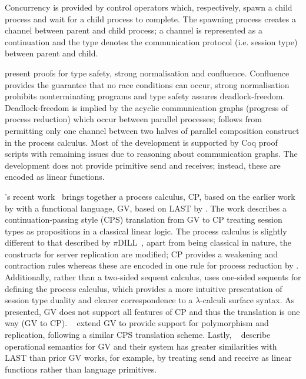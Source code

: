 \documentclass{mprop}
\begin{document}
Concurrency is provided by control operators which, respectively, spawn a
child process and wait for a child process to complete. The spawning process
creates a channel between parent and child process; a channel is represented
as a continuation and the type denotes the communication protocol
(i.e. session type) between parent and child.

\citeauthor{Mazurak:2010:LCC} present proofs for type safety, strong
normalisation and confluence. Confluence provides the guarantee that no race
conditions can occur, strong normalisation prohibits nonterminating programs
and type safety assures deadlock-freedom. Deadlock-freedom is implied by the
acyclic communication graphs (progress of process reduction) which occur
between parallel processes; follows from permitting only one channel between
two halves of parallel composition construct in the process calculus. Most of
the development is supported by Coq proof scripts with remaining issues due to
reasoning about communication graphs. The development does not provide
primitive send and receives; instead, these are encoded as linear functions.

\citeauthor{Wadler:2014}'s recent work~\cite{Wadler:2014} brings together a
process calculus, CP, based on the earlier work by
\citeauthor{Caires:2010:STI} with a functional language, GV, based on LAST by
\citeauthor{Gay:2010:LAST}. The work describes a continuation-passing style
(CPS) translation from GV to CP treating session types as propositions in a
classical linear logic. The process calculus is slightly different to that
described by $\pi$DILL~\cite{Caires:2010:STI}, apart from being classical in
nature, the constructs for server replication are modified; CP provides a
weakening and contraction rules whereas these are encoded in one rule for
process reduction by \citeauthor{Caires:2010:STI}. Additionally, rather than a
two-sided sequent calculus, \citeauthor{Wadler:2014} uses one-sided sequents
for defining the process calculus, which provides a more intuitive
presentation of session type duality and clearer correspondence to a
$\lambda$-calculi surface syntax. As presented, GV does not support all
features of CP and thus the translation is one way (GV to
CP). \citeauthor{Lindley:2014:SAP}~\cite{Lindley:2014:SAP} extend GV to
provide support for polymorphism and replication, following a similar CPS
translation scheme. Lastly,
\citeauthor{Lindley:2014:SPS}~\cite{Lindley:2014:SPS} describe operational
semantics for GV and their system has greater similarities with LAST than
prior GV works, for example, by treating send and receive as linear functions
rather than language primitives.
\end{document}

